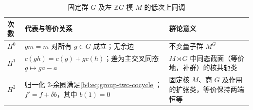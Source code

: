 \begin{table}[htbp]
	\centering
	\caption{固定群 \(G\) 及左 \(\mathbb ZG\) 模 \(M\) 的低次上同调}
	\label{b4:tab:group-cohomology-low-degrees}
	\begin{tabularx}{\textwidth}{@{}p{}>{\raggedright\arraybackslash}X>{\raggedright\arraybackslash}X@{}}
		\toprule
		次数 & 代表与等价关系 & 群论意义 \\
		\midrule
		\(H^0\) & \(gm=m\) 对所有 \(g\in G\) 成立；无余边 & 不变量子群 \(M^G\) \\
		\(H^1\) & \(c(gh)=c(g)+gc(h)\)；\newline 差为主交叉同态 \(g\mapsto ga-a\) & \(M\rtimes G\) 中同态截面（等价地，补群）的核共轭类 \\
		\(H^2\) & 归一化 \(2\)-余圈满足\eqref{b4:eq:group-two-cocycle}；\newline \(f' = f+\delta b\)，其中 \(b(1)=0\) & 固定核 \(M\)、商 \(G\) 及作用的扩张类，等价保持两端恒等 \\
		\bottomrule
	\end{tabularx}
\end{table}
